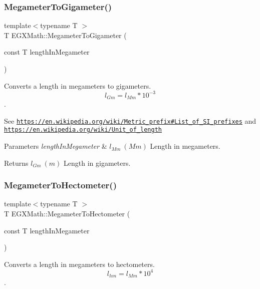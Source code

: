\subsubsection{\texorpdfstring{Megameter\+To\+Gigameter()}{MegameterToGigameter()}}
{\footnotesize\ttfamily template$<$typename T $>$ \\
T E\+G\+X\+Math\+::\+Megameter\+To\+Gigameter (\begin{DoxyParamCaption}\item[{const T}]{length\+In\+Megameter }\end{DoxyParamCaption})}



Converts a length in megameters to gigameters. \[ l_{Gm}=l_{Mm} * 10^{-3} \]. 

See \href{https://en.wikipedia.org/wiki/Metric_prefix#List_of_SI_prefixes}{\tt https\+://en.\+wikipedia.\+org/wiki/\+Metric\+\_\+prefix\#\+List\+\_\+of\+\_\+\+S\+I\+\_\+prefixes} and \href{https://en.wikipedia.org/wiki/Unit_of_length}{\tt https\+://en.\+wikipedia.\+org/wiki/\+Unit\+\_\+of\+\_\+length} 
\begin{DoxyParams}{Parameters}
{\em length\+In\+Megameter} & $ l_{Mm}\ (Mm)$ Length in megameters. \\
\hline
\end{DoxyParams}
\begin{DoxyReturn}{Returns}
$ l_{Gm}\ (m)$ Length in gigameters. 
\end{DoxyReturn}
\mbox{\label{group___e_g_x_math-_conversions-_length_conversions-_s_i-_megameter-_s_i_gad3460fd29fbb8232307cb7cb7265edce}} 
\subsubsection{\texorpdfstring{Megameter\+To\+Hectometer()}{MegameterToHectometer()}}
{\footnotesize\ttfamily template$<$typename T $>$ \\
T E\+G\+X\+Math\+::\+Megameter\+To\+Hectometer (\begin{DoxyParamCaption}\item[{const T}]{length\+In\+Megameter }\end{DoxyParamCaption})}



Converts a length in megameters to hectometers. \[ l_{hm}=l_{Mm} * 10^{4} \]. 

